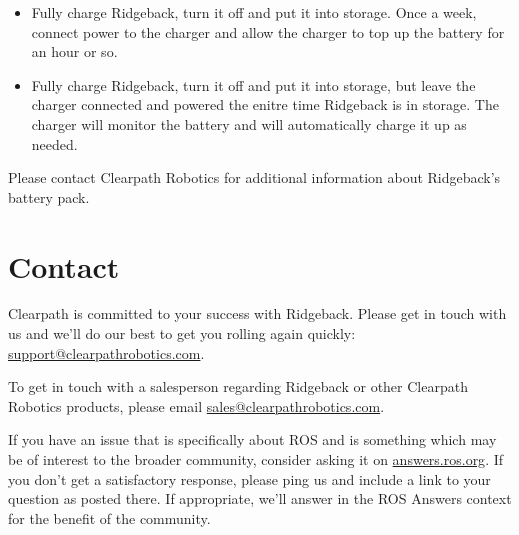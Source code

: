 \documentclass[]{clearpath-latex/clearpath-manual}
\begin{document}
\begin{itemize}[nolistsep]
	\item Fully charge Ridgeback, turn it off and put it into storage.  Once a week, connect power to the charger and allow the charger to top up the battery for an hour or so.
	\item Fully charge Ridgeback, turn it off and put it into storage, but leave the charger connected and powered the enitre time Ridgeback is in storage.  The charger will monitor the battery and will automatically charge it up as needed.
\end{itemize}


Please contact Clearpath Robotics for additional information about Ridgeback's battery pack.


%
%
%
%
%

\section{Contact}
\label{contact}

Clearpath is committed to your success with Ridgeback. Please get in touch with us and we’ll do our best to get
you rolling again quickly: \url{support@clearpathrobotics.com}.

To get in touch with a salesperson regarding Ridgeback or other Clearpath Robotics products, please email
\url{sales@clearpathrobotics.com}.

If you have an issue that is specifically about ROS and is something which may be of interest to the broader
community, consider asking it on \url{answers.ros.org}. If you don’t get a satisfactory response, please ping us and
include a link to your question as posted there. If appropriate, we’ll answer in the ROS Answers context for
the benefit of the community.
\end{document}
